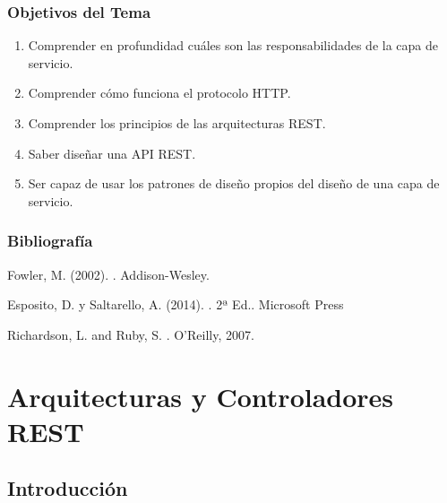\documentclass[a4paper,slidestop,xcolor=pst,blue]{beamer}
\begin{document}
\begin{frame}[c]
    \frametitle{Objetivos del Tema}
    \begin{enumerate}[<+->]
         \item Comprender en profundidad cuáles son las responsabilidades de la capa de servicio.
         \item Comprender cómo funciona el protocolo HTTP.
         \item Comprender los principios de las arquitecturas REST.
         \item Saber diseñar una API REST.
         \item Ser capaz de usar los patrones de diseño propios del diseño de una capa de servicio.
    \end{enumerate}
\end{frame}

\begin{frame}[c]
    \frametitle{Bibliografía}
    \begin{thebibliography}{1}

        Fowler, M. (2002).
        .
        \newblock Addison-Wesley.

        Esposito, D. y Saltarello, A. (2014).
        . 2ª Ed..
        \newblock Microsoft Press

        Richardson, L. and Ruby, S.
        .
        \newblock  O'Reilly, 2007.

    \end{thebibliography}
\end{frame}

\section{Arquitecturas y Controladores REST}

\subsection{Introducción}
\end{document}
